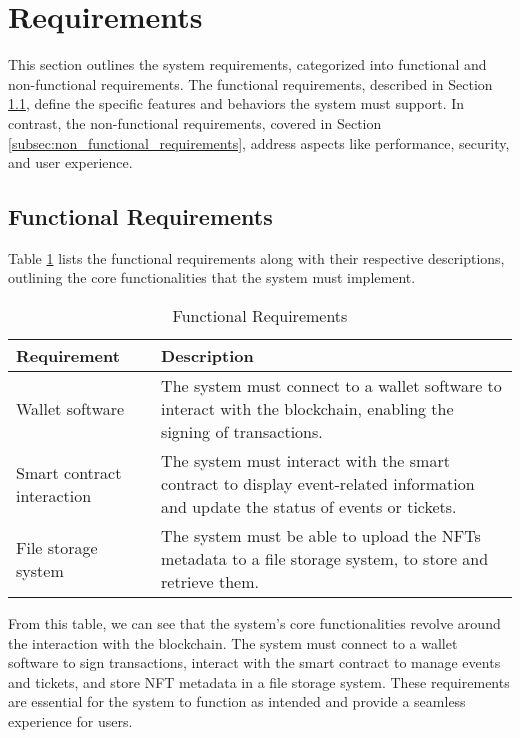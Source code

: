 \section{Requirements}
\label{sec:requirements}

This section outlines the system requirements, categorized into functional and
non-functional requirements. The functional requirements, described in Section
\ref{subsec:functional_requirements}, define the specific features and
behaviors the system must support. In contrast, the non-functional
requirements, covered in Section \ref{subsec:non_functional_requirements},
address aspects like performance, security, and user experience.

\subsection{Functional Requirements}
\label{subsec:functional_requirements}

Table \ref{tab:functional_requirements} lists the functional requirements along
with their respective descriptions, outlining the core functionalities that the
system must implement.

\begin{table}[H]
    \centering
    \begin{tabularx}{\textwidth}{lX}
        \hline
        \textbf{Requirement}       & \textbf{Description}                                                                                                              \\
        \hline
        Wallet software            & The system must connect to a wallet software to interact with the blockchain, enabling the signing of transactions.               \\
        \hline
        Smart contract interaction & The system must interact with the smart contract to display event-related information and update the status of events or tickets. \\
        \hline
        File storage system        & The system must be able to upload the NFTs metadata to a file storage system, to store and retrieve them.                         \\
        \hline
    \end{tabularx}
    \caption{Functional Requirements}
    \label{tab:functional_requirements}
\end{table}

From this table, we can see that the system's core functionalities revolve around the interaction with the blockchain. The system must connect to a wallet software to sign transactions, interact with the smart contract to manage events and tickets, and store NFT metadata in a file storage system. These requirements are essential for the system to function as intended and provide a seamless experience for users.

